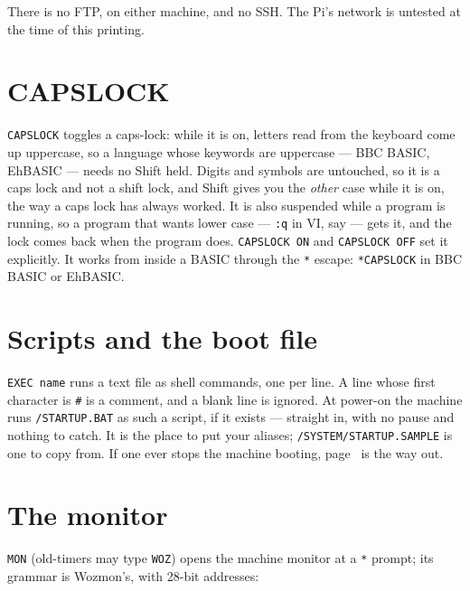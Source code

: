 \noindent There is no FTP, on either machine, and no SSH. The Pi's
network is untested at the time of this printing.

\section{CAPSLOCK}
\verb|CAPSLOCK| toggles a caps-lock: while it is on, letters read from the
keyboard come up uppercase, so a language whose keywords are uppercase ---
BBC BASIC, EhBASIC --- needs no Shift held. Digits and symbols are
untouched, so it is a caps lock and not a shift lock, and Shift gives you
the \emph{other} case while it is on, the way a caps lock has always
worked. It is also suspended while a program is running, so a program
that wants lower case --- \verb|:q| in VI, say --- gets it, and the lock
comes back when the program does. \verb|CAPSLOCK ON|
and \verb|CAPSLOCK OFF| set it explicitly. It works from inside a BASIC
through the \texttt{*} escape: \verb|*CAPSLOCK| in BBC BASIC or EhBASIC.

\section{Scripts and the boot file}
\verb|EXEC name| runs a text file as shell commands, one per line. A line
whose first character is \verb|#| is a comment, and a blank line is
ignored. At power-on the machine runs \verb|/STARTUP.BAT| as such a
script, if it exists --- straight in, with no pause and nothing to
catch. It is the place to put your aliases;
\texttt{/SYSTEM/STARTUP.SAMPLE} is one to copy from. If one ever stops
the machine booting, page~\pageref{sec:badstartup} is the way out.

\section{The monitor}
\verb|MON| (old-timers may type \verb|WOZ|) opens the machine monitor at a
\verb|*| prompt; its grammar is Wozmon's, with 28-bit addresses:



